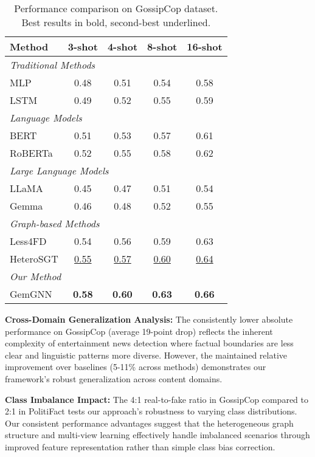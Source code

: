 \begin{table}[htbp]
\centering
\caption{Performance comparison on GossipCop dataset. Best results in bold, second-best underlined.}
\label{tab:results:gossipcop}
\begin{tabular}{lcccc}
\toprule
\textbf{Method} & \textbf{3-shot} & \textbf{4-shot} & \textbf{8-shot} & \textbf{16-shot} \\
\midrule
\multicolumn{5}{l}{\textit{Traditional Methods}} \\
MLP & 0.48 & 0.51 & 0.54 & 0.58 \\
LSTM & 0.49 & 0.52 & 0.55 & 0.59 \\
\midrule
\multicolumn{5}{l}{\textit{Language Models}} \\
BERT & 0.51 & 0.53 & 0.57 & 0.61 \\
RoBERTa & 0.52 & 0.55 & 0.58 & 0.62 \\
\midrule
\multicolumn{5}{l}{\textit{Large Language Models}} \\
LLaMA & 0.45 & 0.47 & 0.51 & 0.54 \\
Gemma & 0.46 & 0.48 & 0.52 & 0.55 \\
\midrule
\multicolumn{5}{l}{\textit{Graph-based Methods}} \\
Less4FD & 0.54 & 0.56 & 0.59 & 0.63 \\
HeteroSGT & \underline{0.55} & \underline{0.57} & \underline{0.60} & \underline{0.64} \\
\midrule
\multicolumn{5}{l}{\textit{Our Method}} \\
GemGNN & \textbf{0.58} & \textbf{0.60} & \textbf{0.63} & \textbf{0.66} \\
\bottomrule
\end{tabular}
\end{table}

\textbf{Cross-Domain Generalization Analysis:} The consistently lower absolute performance on GossipCop (average 19-point drop) reflects the inherent complexity of entertainment news detection where factual boundaries are less clear and linguistic patterns more diverse. However, the maintained relative improvement over baselines (5-11\% across methods) demonstrates our framework's robust generalization across content domains.

\textbf{Class Imbalance Impact:} The 4:1 real-to-fake ratio in GossipCop compared to 2:1 in PolitiFact tests our approach's robustness to varying class distributions. Our consistent performance advantages suggest that the heterogeneous graph structure and multi-view learning effectively handle imbalanced scenarios through improved feature representation rather than simple class bias correction.

